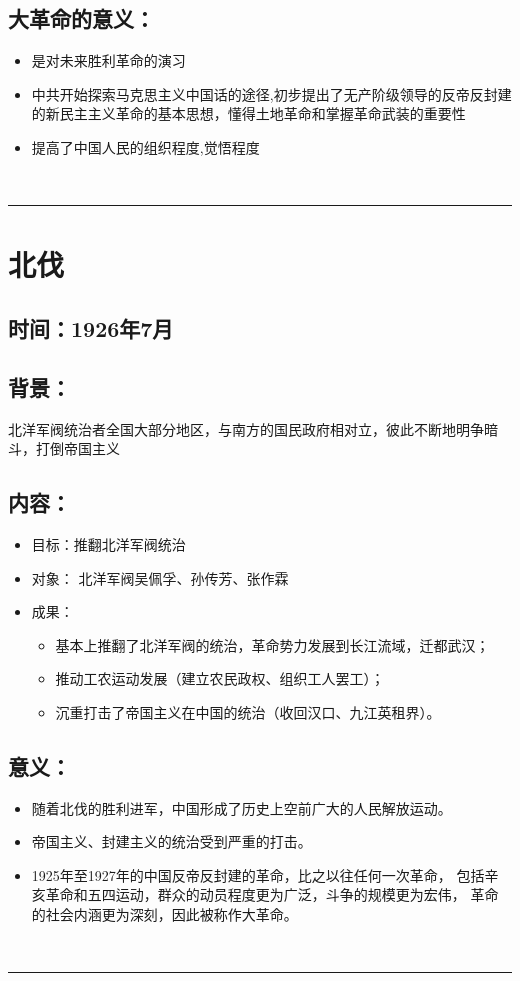 \documentclass{article}
\begin{document}
\subsection*{大革命的意义：}
\begin{itemize}
	\item 是对未来胜利革命的演习
	\item 中共开始探索马克思主义中国话的途径,初步提出了无产阶级领导的反帝反封建的新民主主义革命的基本思想，懂得土地革命和掌握革命武装的重要性
	\item 提高了中国人民的组织程度,觉悟程度
\end{itemize}
\ \hrule

\section*{北伐}
\subsection*{时间：1926年7月}
\subsection*{背景：}
\noindent 北洋军阀统治者全国大部分地区，与南方的国民政府相对立，彼此不断地明争暗斗，打倒帝国主义
\subsection*{内容：}
\begin{itemize}
    \item 目标：推翻北洋军阀统治
    \item 对象： 北洋军阀吴佩孚、孙传芳、张作霖
    \item 成果： 
    \begin{itemize}
    	\item 基本上推翻了北洋军阀的统治，革命势力发展到长江流域，迁都武汉；
    \item  推动工农运动发展（建立农民政权、组织工人罢工）；
    \item 沉重打击了帝国主义在中国的统治（收回汉口、九江英租界）。
    \end{itemize}
\end{itemize}
\subsection*{意义：}
\begin{itemize}
    \item 随着北伐的胜利进军，中国形成了历史上空前广大的人民解放运动。
    \item 帝国主义、封建主义的统治受到严重的打击。
    \item 1925年至1927年的中国反帝反封建的革命，比之以往任何一次革命，
    包括辛亥革命和五四运动，群众的动员程度更为广泛，斗争的规模更为宏伟，
    革命的社会内涵更为深刻，因此被称作大革命。
\end{itemize}
\ \hrule
\end{document}
